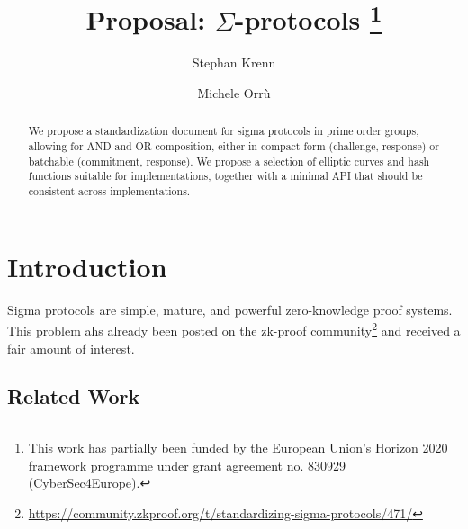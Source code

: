 \documentclass[runningheads]{llncs}
\begin{document}
\title{Proposal: $\Sigma$-protocols%
\thanks{This work has partially been funded by the European Union's Horizon 2020 framework programme under grant agreement no. 830929 (CyberSec4Europe).}}
%

\author{Stephan Krenn\and
        Michele Orr\`u}


%
\maketitle              %
%
\begin{abstract}
  We propose a standardization document for sigma protocols in prime order groups, allowing for AND and OR composition, either in compact form (challenge, response) or batchable (commitment, response). We propose a selection of elliptic curves and hash functions suitable for implementations, together with a minimal API that should be consistent across implementations.

\end{abstract}

\section{Introduction}

Sigma protocols are simple, mature, and powerful zero-knowledge proof systems.
This problem ahs already been posted on the zk-proof community\footnote{\url{https://community.zkproof.org/t/standardizing-sigma-protocols/471/}} and received a fair amount of interest.

\subsection{Related Work}
\end{document}
